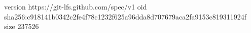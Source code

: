 version https://git-lfs.github.com/spec/v1
oid sha256:c918141b0342c2fe4f78c1232f625a96dda8d707679aca2fa9153c819311924f
size 237526
